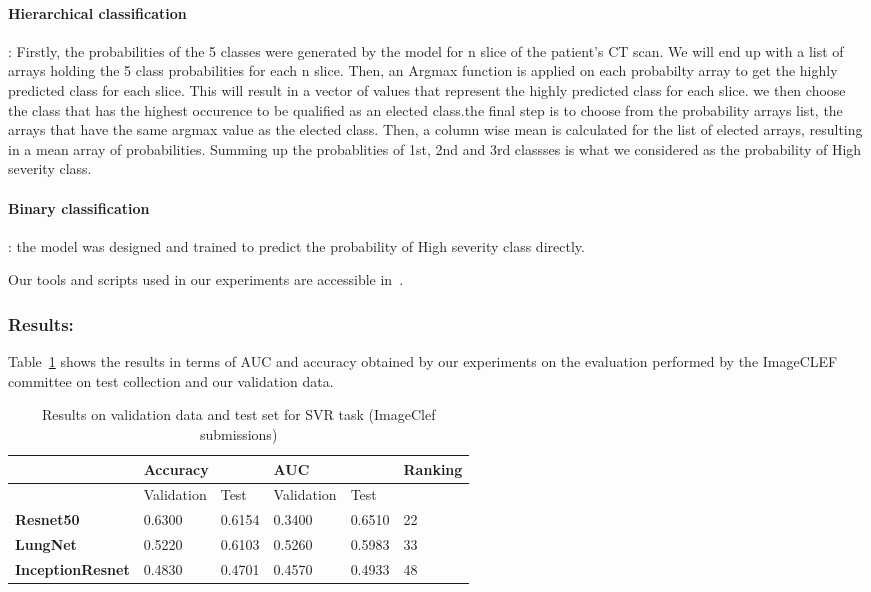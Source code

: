 \paragraph{Hierarchical classification}: Firstly, the probabilities of the 5 classes were generated by the model for n slice of the patient's CT scan. We will end up with a list of arrays holding the 5 class probabilities for each n slice. Then, an Argmax function is applied on each probabilty array to get the highly predicted class for each slice. This will result in a vector of values that represent the highly predicted class for each slice. we then choose the class that has the highest occurence to be qualified as an elected class.the final step is to choose from the probability arrays list, the arrays that have the same argmax value as the elected class. Then, a column wise mean is calculated for the list of elected arrays, resulting in a mean array of probabilities. Summing up the probablities of 1st, 2nd and 3rd classses is what we considered as the probability of High severity class.
\paragraph{Binary classification}: the model was designed and trained to predict the probability of High severity class directly.

Our tools and scripts used in our experiments are accessible in~\cite{anouargit}.

\subsubsection{Results:}

Table~\ref{tab:resultstestsvr} shows the results in terms of AUC and accuracy obtained by our experiments on the evaluation performed by the ImageCLEF committee on test collection and our validation data.

\begin{table}[h!]
\center
\begin{tabular}{|l|l|l|l|l|l|l|}
\hline
          & \multicolumn{2}{l|}{Accuracy} & \multicolumn{2}{l|}{AUC} & \multicolumn{2}{l|}{Ranking}                                         \\ \hline
          & Validation      & Test        & Validation    & Test     & \multicolumn{2}{l|}{} \\ \hline
\textbf{Resnet50}  & 0.6300            & 0.6154      & 0.3400          & 0.6510   & \multicolumn{2}{l|}{22}                                              \\ \hline
\textbf{LungNet}   & 0.5220           & 0.6103      & 0.5260         & 0.5983   & \multicolumn{2}{l|}{33}                                              \\ \hline
\textbf{InceptionResnet} & 0.4830           & 0.4701      & 0.4570         & 0.4933   & \multicolumn{2}{l|}{ 48} \\ \hline

\end{tabular}%
\label{tab:resultstestsvr}
  \caption{Results on validation data and test set for SVR task (ImageClef submissions)}
\end{table}

